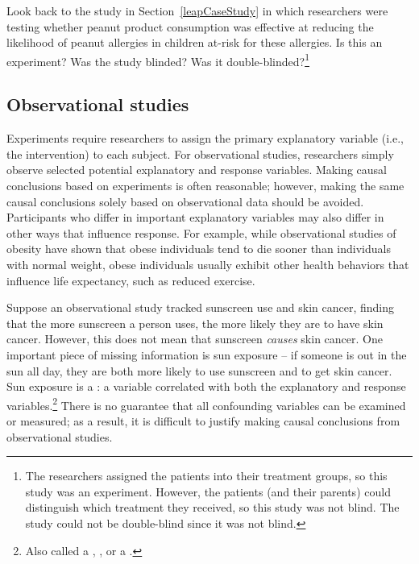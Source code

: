 \begin{exercise}
	Look back to the study in Section~\ref{leapCaseStudy} in which researchers were testing whether peanut product consumption was effective at reducing the likelihood of peanut allergies in children at-risk for these allergies. Is this an experiment? Was the study blinded? Was it double-blinded?\footnote{The researchers assigned the patients into their treatment groups, so this study was an experiment. However, the patients (and their parents) could distinguish which treatment they received, so this study was not blind. The study could not be double-blind since it was not blind.}
\end{exercise}

\subsection{Observational studies}

Experiments require researchers to assign the primary explanatory variable (i.e., the intervention) to each subject. For observational studies, researchers simply observe selected potential explanatory and response variables. Making causal conclusions based on experiments is often reasonable; however, making the same causal conclusions solely based on observational data should be avoided. Participants who differ in important explanatory variables may also differ in other ways that influence response.  For example, while observational studies of obesity have shown that obese individuals tend to die sooner than individuals with normal weight, obese individuals usually exhibit other health behaviors that influence life expectancy, such as reduced exercise.  

Suppose an observational study tracked sunscreen use and skin cancer, finding that the more sunscreen a person uses, the more likely they are to have skin cancer. However, this does not mean that sunscreen \emph{causes} skin cancer. One important piece of missing information is sun exposure -- if someone is out in the sun all day, they are both more likely to use sunscreen and to get skin cancer. Sun exposure is a  : a variable correlated with both the explanatory and response variables.\footnote{Also called a , , or a .} There is no guarantee that all confounding variables can be examined or measured; as a result, it is difficult to justify making causal conclusions from observational studies. 

